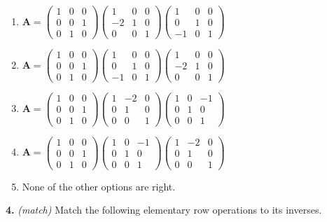 \documentclass[10pt,a4paper]{article}
\begin{document}
\begin{enumerate}[label=(\Alph*)]
\item \(\mathbf{A}=\begin{pmatrix}1&0&0\\0&0&1\\0&1&0\end{pmatrix}\begin{pmatrix}1&0&0\\-2&1&0\\0&0&1\end{pmatrix}\begin{pmatrix}1&0&0\\0&1&0\\-1&0&1\end{pmatrix}\)
\item \(\mathbf{A}=\begin{pmatrix}1&0&0\\0&0&1\\0&1&0\end{pmatrix}\begin{pmatrix}1&0&0\\0&1&0\\-1&0&1\end{pmatrix}\begin{pmatrix}1&0&0\\-2&1&0\\0&0&1\end{pmatrix}\)
\item \(\mathbf{A}=\begin{pmatrix}1&0&0\\0&0&1\\0&1&0\end{pmatrix}\begin{pmatrix}1&-2&0\\0&1&0\\0&0&1\end{pmatrix}\begin{pmatrix}1&0&-1\\0&1&0\\0&0&1\end{pmatrix}\)
\item \(\mathbf{A}=\begin{pmatrix}1&0&0\\0&0&1\\0&1&0\end{pmatrix}\begin{pmatrix}1&0&-1\\0&1&0\\0&0&1\end{pmatrix}\begin{pmatrix}1&-2&0\\0&1&0\\0&0&1\end{pmatrix}\)
\item None of the other options are right.
\end{enumerate}
\smallskip
\textbf{4.} \textit{(match)} Match the following elementary row operations to its inverses.
\end{document}
